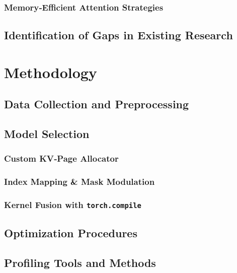 \documentclass[11pt]{article}
\begin{document}
  \subsubsection{Memory‑Efficient Attention Strategies}

  \subsection{Identification of Gaps in Existing Research}

\section{Methodology}
  \subsection{Data Collection and Preprocessing}

  \subsection{Model Selection}
  \subsubsection{Custom KV‑Page Allocator}
  \subsubsection{Index Mapping \& Mask Modulation}
  \subsubsection{Kernel Fusion with \texttt{torch.compile}}

  \subsection{Optimization Procedures}

  \subsection{Profiling Tools and Methods}
\end{document}
